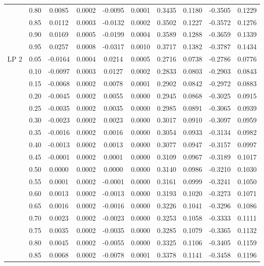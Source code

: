 \begin{table}[H]
\begin{tabular}{cccccccccc}
   & 0.80 & 0.0085 & 0.0002 & -0.0095 & 0.0001 & 0.3435 & 0.1180 & -0.3505 & 0.1229 \\ 
   & 0.85 & 0.0112 & 0.0003 & -0.0132 & 0.0002 & 0.3502 & 0.1227 & -0.3572 & 0.1276 \\ 
   & 0.90 & 0.0169 & 0.0005 & -0.0199 & 0.0004 & 0.3589 & 0.1288 & -0.3659 & 0.1339 \\ 
   & 0.95 & 0.0257 & 0.0008 & -0.0317 & 0.0010 & 0.3717 & 0.1382 & -0.3787 & 0.1434 \\ 
  LP 2 & 0.05 & -0.0164 & 0.0004 & 0.0214 & 0.0005 & 0.2716 & 0.0738 & -0.2786 & 0.0776 \\ 
   & 0.10 & -0.0097 & 0.0003 & 0.0127 & 0.0002 & 0.2833 & 0.0803 & -0.2903 & 0.0843 \\ 
   & 0.15 & -0.0068 & 0.0002 & 0.0078 & 0.0001 & 0.2902 & 0.0842 & -0.2972 & 0.0883 \\ 
   & 0.20 & -0.0045 & 0.0002 & 0.0055 & 0.0000 & 0.2945 & 0.0868 & -0.3025 & 0.0915 \\ 
   & 0.25 & -0.0035 & 0.0002 & 0.0035 & 0.0000 & 0.2985 & 0.0891 & -0.3065 & 0.0939 \\ 
   & 0.30 & -0.0023 & 0.0002 & 0.0023 & 0.0000 & 0.3017 & 0.0910 & -0.3097 & 0.0959 \\ 
   & 0.35 & -0.0016 & 0.0002 & 0.0016 & 0.0000 & 0.3054 & 0.0933 & -0.3134 & 0.0982 \\ 
   & 0.40 & -0.0013 & 0.0002 & 0.0013 & 0.0000 & 0.3077 & 0.0947 & -0.3157 & 0.0997 \\ 
   & 0.45 & -0.0001 & 0.0002 & 0.0001 & 0.0000 & 0.3109 & 0.0967 & -0.3189 & 0.1017 \\ 
   & 0.50 & 0.0000 & 0.0002 & 0.0000 & 0.0000 & 0.3140 & 0.0986 & -0.3210 & 0.1030 \\ 
   & 0.55 & 0.0001 & 0.0002 & -0.0001 & 0.0000 & 0.3161 & 0.0999 & -0.3241 & 0.1050 \\ 
   & 0.60 & 0.0013 & 0.0002 & -0.0013 & 0.0000 & 0.3193 & 0.1020 & -0.3273 & 0.1071 \\ 
   & 0.65 & 0.0016 & 0.0002 & -0.0016 & 0.0000 & 0.3226 & 0.1041 & -0.3296 & 0.1086 \\ 
   & 0.70 & 0.0023 & 0.0002 & -0.0023 & 0.0000 & 0.3253 & 0.1058 & -0.3333 & 0.1111 \\ 
   & 0.75 & 0.0035 & 0.0002 & -0.0035 & 0.0000 & 0.3285 & 0.1079 & -0.3365 & 0.1132 \\ 
   & 0.80 & 0.0045 & 0.0002 & -0.0055 & 0.0000 & 0.3325 & 0.1106 & -0.3405 & 0.1159 \\ 
   & 0.85 & 0.0068 & 0.0002 & -0.0078 & 0.0001 & 0.3378 & 0.1141 & -0.3458 & 0.1196 \\ 

\end{tabular}
\end{table}
